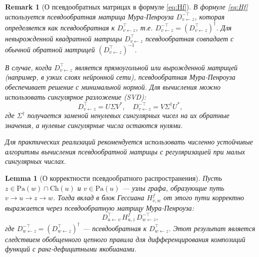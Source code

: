 \documentclass[11pt]{article}
\newtheorem{lemma}{Lemma}
\newtheorem{remark}{Remark}
\newcommand{\Pa}{\mathrm{Pa}} %
\newcommand{\Ch}{\mathrm{Ch}} %
\begin{document}
\begin{remark}[О псевдообратных матрицах в формуле \eqref{eq:Hf}]
  В формуле \eqref{eq:Hf} используется псевдообратная матрица Мура-Пенроуза $D_{v\gets z}^{-\top}$, которая
  определяется как псевдообратная к $D_{v\gets z}^{\top}$, т.е. $D_{v\gets z}^{-\top} = (D_{v\gets
  z}^{\top})^{\dagger}$. Для невырожденной квадратной матрицы $D_{v\gets
  z}^{\top}$ псевдообратная совпадает с обычной обратной матрицей $(D_{v\gets z}^{\top})^{-1}$.

  В случае, когда $D_{v\gets z}^{\top}$ является прямоугольной или вырожденной матрицей (например, в узких
  слоях нейронной сети), псевдообратная Мура-Пенроуза обеспечивает решение с минимальной нормой. Для
  вычисления можно использовать сингулярное разложение (SVD):
  \[
    D_{v\gets z}^{\top} = U\Sigma V^*, \quad D_{v\gets z}^{-\top} = V\Sigma^{\dagger} U^*,
  \]
  где $\Sigma^{\dagger}$ получается заменой ненулевых сингулярных чисел на их обратные значения, а нулевые
  сингулярные числа остаются нулями.

  Для практических реализаций рекомендуется использовать численно устойчивые алгоритмы вычисления
  псевдообратной матрицы с регуляризацией при малых сингулярных числах.
\end{remark}

\begin{lemma}[О корректности псевдообратного распространения]
  Пусть $z \in \Pa(w) \cap \Ch(u)$ и $v \in \Pa(u)$ — узлы графа, образующие путь $v \rightarrow u
  \rightarrow z \rightarrow w$. Тогда вклад в блок Гессиана $H^f_{v,w}$ от этого пути корректно выражается
  через псевдообратную матрицу Мура-Пенроуза:
  \[
    D_{u\gets v}^\top\,H^f_{u,z}\,D_{w\gets z}^{-\top},
  \]
  где $D_{w\gets z}^{-\top} = (D_{w\gets z}^{\top})^{\dagger}$ — псевдообратная к $D_{w\gets z}^\top$. Этот
  результат является следствием обобщенного цепного правила для дифференцирования композиций функций с
  ранг-дефицитными якобианами.
\end{lemma}
\end{document}
